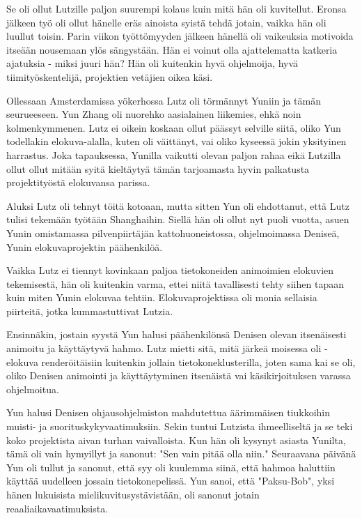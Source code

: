 Se oli ollut Lutzille paljon suurempi kolaus kuin mitä hän oli kuvitellut. Eronsa jälkeen työ oli ollut hänelle eräs ainoista syistä tehdä jotain, vaikka hän oli luullut toisin. Parin viikon työttömyyden jälkeen hänellä oli vaikeuksia motivoida itseään nousemaan ylös sängystään. Hän ei voinut olla ajattelematta katkeria ajatuksia - miksi juuri hän? Hän oli kuitenkin hyvä ohjelmoija, hyvä tiimityöskentelijä, projektien vetäjien oikea käsi.




\psep Ollessaan Amsterdamissa yökerhossa Lutz oli törmännyt Yuniin ja tämän seurueeseen. Yun Zhang oli nuorehko aasialainen liikemies, ehkä noin kolmenkymmenen. Lutz ei oikein koskaan ollut päässyt selville siitä, oliko Yun todellakin elokuva-alalla, kuten oli väittänyt, vai oliko kyseessä jokin yksityinen harrastus. Joka tapauksessa, Yunilla vaikutti olevan paljon rahaa eikä Lutzilla ollut ollut mitään syitä kieltäytyä tämän tarjoamasta hyvin palkatusta projektityöstä elokuvansa parissa.


Aluksi Lutz oli tehnyt töitä kotoaan, mutta sitten Yun oli ehdottanut, että Lutz tulisi tekemään työtään Shanghaihin. Siellä hän oli ollut nyt puoli vuotta, asuen Yunin omistamassa pilvenpiirtäjän kattohuoneistossa, ohjelmoimassa Deniseä, Yunin elokuvaprojektin päähenkilöä.


Vaikka Lutz ei tiennyt kovinkaan paljoa tietokoneiden animoimien elokuvien tekemisestä, hän oli kuitenkin varma, ettei niitä tavallisesti tehty siihen tapaan kuin miten Yunin elokuvaa tehtiin. Elokuvaprojektissa oli monia sellaisia piirteitä, jotka kummastuttivat Lutzia.


Ensinnäkin, jostain syystä Yun halusi päähenkilönsä Denisen olevan itsenäisesti animoitu ja käyttäytyvä hahmo. Lutz mietti sitä, mitä järkeä moisessa oli - elokuva renderöitäisiin kuitenkin jollain tietokoneklusterilla, joten sama kai se oli, oliko Denisen animointi ja käyttäytyminen itsenäistä vai käsikirjoituksen varassa ohjelmoitua.


Yun halusi Denisen ohjausohjelmiston mahdutettua äärimmäisen tiukkoihin muisti- ja suorituskykyvaatimuksiin. Sekin tuntui Lutzista ihmeelliseltä ja se teki koko projektista aivan turhan vaivalloista. Kun hän oli kysynyt asiasta Yunilta, tämä oli vain hymyillyt ja sanonut: "Sen vain pitää olla niin." Seuraavana päivänä Yun oli tullut ja sanonut, että syy oli kuulemma siinä, että hahmoa haluttiin käyttää uudelleen jossain tietokonepelissä. Yun sanoi, että "Paksu-Bob", yksi hänen lukuisista mielikuvitusystävistään, oli sanonut jotain reaaliaikavaatimuksista.


